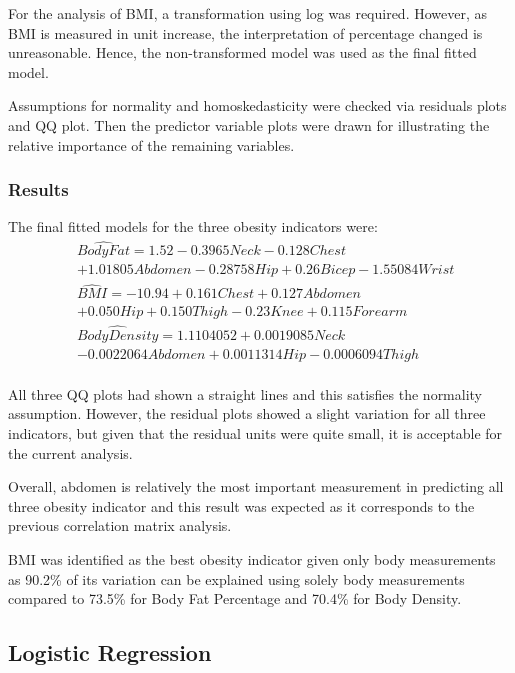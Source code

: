 \documentclass[a4paper,9pt,twocolumn,twoside,]{pinp}
\begin{document}
For the analysis of BMI, a transformation using log was required.
However, as BMI is measured in unit increase, the interpretation of
percentage changed is unreasonable. Hence, the non-transformed model was
used as the final fitted model.

Assumptions for normality and homoskedasticity were checked via
residuals plots and QQ plot. Then the predictor variable plots were
drawn for illustrating the relative importance of the remaining
variables.

\hypertarget{results}{%
\subsubsection{Results}\label{results}}

The final fitted models for the three obesity indicators were: \[ 
\begin{equation}
\begin{aligned}
&\hat{Body Fat} = 1.52 -0.3965Neck - 0.128Chest\\
&+ 1.01805Abdomen -0.28758Hip + 0.26Bicep -1.55084Wrist\\
&\hat{BMI} = -10.94 +0.161Chest + 0.127Abdomen\\
&+ 0.050Hip + 0.150Thigh - 0.23Knee + 0.115Forearm\\
&\hat{Body Density} = 1.1104052 + 0.0019085 Neck\\
&- 0.0022064Abdomen + 0.0011314 Hip - 0.0006094 Thigh\\
\end{aligned}
\end{equation}
\]

All three QQ plots had shown a straight lines and this satisfies the
normality assumption. However, the residual plots showed a slight
variation for all three indicators, but given that the residual units
were quite small, it is acceptable for the current analysis.

Overall, abdomen is relatively the most important measurement in
predicting all three obesity indicator and this result was expected as
it corresponds to the previous correlation matrix analysis.

BMI was identified as the best obesity indicator given only body
measurements as 90.2\% of its variation can be explained using solely
body measurements compared to 73.5\% for Body Fat Percentage and 70.4\%
for Body Density.

\hypertarget{logistic-regression}{%
\subsection{Logistic Regression}\label{logistic-regression}}
\end{document}

